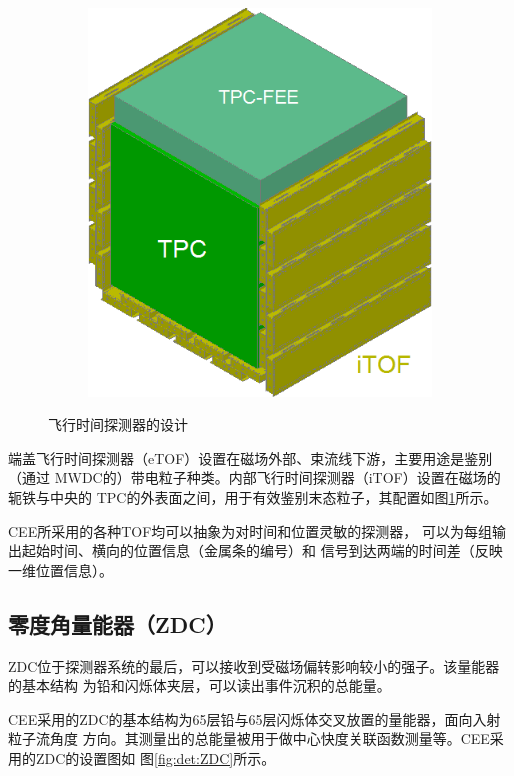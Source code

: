 \documentclass[bachelor,openany,oneside,color]{buaathesis}
\begin{document}
\begin{figure}
\begin{subfigure}{0.5\textwidth}
		\includegraphics[width=\textwidth]{./resource/CEE-iTOF.png}
		\label{fig:det:TOF:iTOF}
	\end{subfigure}
	\caption{飞行时间探测器的设计\cite{技术文档}}
	\label{fig:det:TOF}
\end{figure}

端盖飞行时间探测器（eTOF）设置在磁场外部、束流线下游，主要用途是鉴别（通过
MWDC的）带电粒子种类。内部飞行时间探测器（iTOF）设置在磁场的轭铁与中央的
TPC的外表面之间，用于有效鉴别末态粒子，其配置如图\ref{fig:det:TOF:iTOF}所示。

CEE所采用的各种TOF均可以抽象为对时间和位置灵敏的探测器，
可以为每组输出起始时间、横向的位置信息（金属条的编号）和
信号到达两端的时间差（反映一维位置信息）。

\subsection{零度角量能器（ZDC）}

ZDC位于探测器系统的最后，可以接收到受磁场偏转影响较小的强子。该量能器的基本结构
为铅和闪烁体夹层，可以读出事件沉积的总能量。

CEE采用的ZDC的基本结构为65层铅与65层闪烁体交叉放置的量能器，面向入射粒子流角度
方向。其测量出的总能量被用于做中心快度关联函数测量等。CEE采用的ZDC的设置图如
图\ref{fig:det:ZDC}所示。
\end{document}
